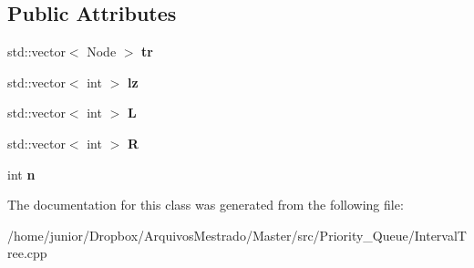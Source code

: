 \subsection*{Public Attributes}
\begin{DoxyCompactItemize}
\item 
\mbox{\label{classIntervalTreeSum_a6b09df6071514ab27a14b4e8c6392d12}} 
std\+::vector$<$ Node $>$ {\bfseries tr}
\item 
\mbox{\label{classIntervalTreeSum_a0c7d79b743167b4d10bc385b81615bce}} 
std\+::vector$<$ int $>$ {\bfseries lz}
\item 
\mbox{\label{classIntervalTreeSum_ace6fe11cd27dc4a3e802041e3249d2a9}} 
std\+::vector$<$ int $>$ {\bfseries L}
\item 
\mbox{\label{classIntervalTreeSum_a4c42ab68d21e4a74968f96378fc83e9c}} 
std\+::vector$<$ int $>$ {\bfseries R}
\item 
\mbox{\label{classIntervalTreeSum_a85d06cdac04d11b1b844db94a8ccd9f3}} 
int {\bfseries n}
\end{DoxyCompactItemize}


The documentation for this class was generated from the following file\+:\begin{DoxyCompactItemize}
\item 
/home/junior/\+Dropbox/\+Arquivos\+Mestrado/\+Master/src/\+Priority\+\_\+\+Queue/Interval\+Tree.\+cpp\end{DoxyCompactItemize}
